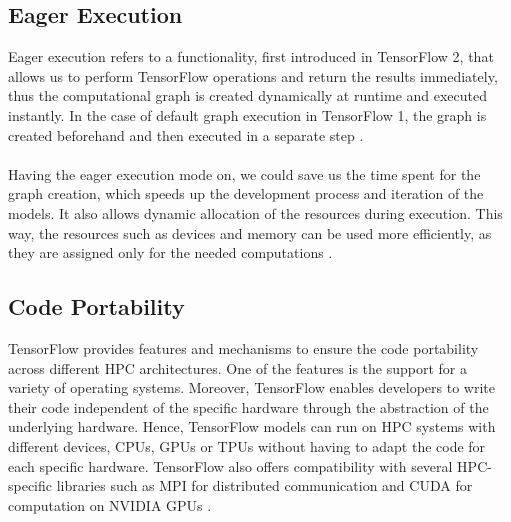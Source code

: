 \documentclass[ieeetran]{article}
\begin{document}
\subsection{Eager Execution} %
\label{sub:eager_execution}
Eager execution refers to a functionality, first introduced in TensorFlow 2, that allows us to perform TensorFlow operations and return the results immediately, thus the computational graph is created dynamically at runtime and executed instantly. In the case of default graph execution in TensorFlow 1, the graph is created beforehand and then executed in a separate step \cite{fourth}. 
\\ \\Having the eager execution mode on, we could save us the time spent for the graph creation, which speeds up the development process and iteration of the models. It also allows dynamic allocation of the resources during execution. This way, the resources such as devices and memory can be used more efficiently, as they are assigned only for the needed computations \cite{fourth}.

\subsection{Code Portability} %
\label{sub:code_portability}
TensorFlow provides features and mechanisms to ensure the code portability across different HPC architectures. One of the features is the support for a variety of operating systems. Moreover, TensorFlow enables developers to write their code independent of the specific hardware through the abstraction of the underlying hardware. Hence, TensorFlow models can run on HPC systems with different devices, CPUs, GPUs or TPUs without having to adapt the code for each specific hardware. TensorFlow also offers compatibility with several HPC-specific libraries such as MPI for distributed communication and CUDA for computation on NVIDIA GPUs \cite{fifth}.
\end{document}
